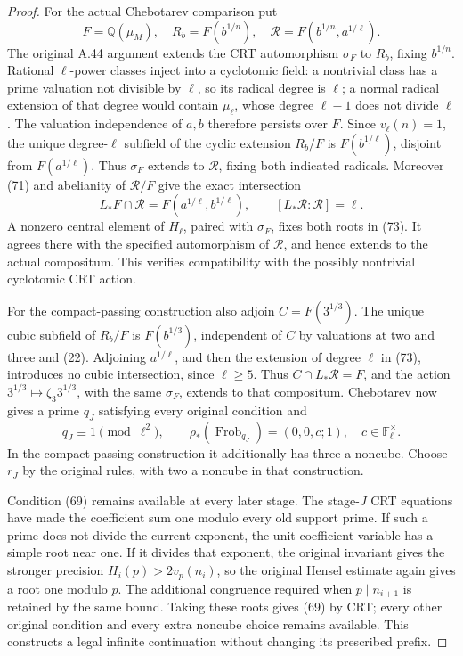 \begin{proof}
For the actual Chebotarev comparison put
\[
 F=\mathbb Q(\mu_M),\quad
 R_b=F(b^{1/n}),\quad
 \mathcal R=F(b^{1/n},a^{1/\ell}).                     \tag{72}
\]
The original A.44 argument extends the CRT
automorphism \(\sigma_F\) to \(R_b\), fixing
\(b^{1/n}\). Rational \(\ell\)-power classes
inject into a cyclotomic field: a nontrivial
class has a prime valuation not divisible by
\(\ell\), so its radical degree is \(\ell\);
a normal radical extension of that degree would
contain \(\mu_\ell\), whose degree \(\ell-1\)
does not divide \(\ell\).
The valuation independence of \(a,b\) therefore
persists over \(F\). Since \(v_\ell(n)=1\),
the unique degree-\(\ell\) subfield of the cyclic
extension \(R_b/F\) is \(F(b^{1/\ell})\),
disjoint from \(F(a^{1/\ell})\).
Thus \(\sigma_F\) extends to \(\mathcal R\),
fixing both indicated radicals. Moreover (71)
and abelianity of \(\mathcal R/F\) give the
exact intersection
\[
 L_*F\cap\mathcal R=F(a^{1/\ell},b^{1/\ell}),
               \qquad [L_*\mathcal R:\mathcal R]=\ell.
                                                        \tag{73}
\]
A nonzero central element of \(H_\ell\), paired
with \(\sigma_F\), fixes both roots in (73).
It agrees there with the specified automorphism
of \(\mathcal R\), and hence extends to the
actual compositum. This verifies compatibility
with the possibly nontrivial cyclotomic CRT action.

For the compact-passing construction also adjoin
\(C=F(3^{1/3})\). The unique cubic subfield of
\(R_b/F\) is \(F(b^{1/3})\), independent of
\(C\) by valuations at two and three and (22).
Adjoining \(a^{1/\ell}\), and then the extension
of degree \(\ell\) in (73), introduces no cubic
intersection, since \(\ell\ge5\). Thus
\(C\cap L_*\mathcal R=F\), and the action
\(3^{1/3}\mapsto\zeta_3 3^{1/3}\), with the
same \(\sigma_F\), extends to that compositum.
Chebotarev now gives a prime \(q_J\) satisfying
every original condition and
\[
 q_J\equiv1\pmod{\ell^2},\qquad
 \rho_*(\operatorname{Frob}_{q_J})=(0,0,c;1),
                 \quad c\in\mathbb F_\ell^\times.
                                                        \tag{74}
\]
In the compact-passing construction it additionally
has three a noncube. Choose \(r_J\) by the original
rules, with two a noncube in that construction.

Condition (69) remains available at every later
stage. The stage-\(J\) CRT equations have made
the coefficient sum one modulo every old support
prime. If such a prime does not divide the current
exponent, the unit-coefficient variable has a
simple root near one. If it divides that exponent,
the original invariant gives the stronger precision
\(H_i(p)>2v_p(n_i)\), so the original Hensel
estimate again gives a root one modulo \(p\).
The additional congruence required when
\(p\mid n_{i+1}\) is retained by the same bound.
Taking these roots gives (69) by CRT; every other
original condition and every extra noncube choice
remains available. This constructs a legal infinite
continuation without changing its prescribed prefix.


\end{proof}
